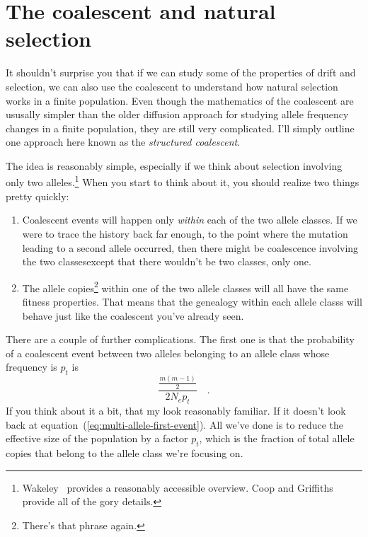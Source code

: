 \section*{The coalescent and natural selection}

It shouldn't surprise you that if we can study some of the properties
of drift and selection, we can also use the coalescent to understand
how natural selection works in a finite population. Even though the
mathematics of the coalescent are ususally simpler than the older
diffusion approach for studying allele frequency changes in a finite
population, they are still very complicated. I'll simply outline one
approach here known as the {\it structured
  coalescent}. 

The idea is reasonably simple, especially if we think about selection
involving only two alleles.\footnote{Wakeley~\cite{Wakeley-2010}
  provides a reasonably accessible overview. Coop and
  Griffiths~\cite{Coop-Griffiths-2004} provide all of the gory
  details.} When you start to think about it, you should realize two
things pretty quickly:

\begin{enumerate}

  \item Coalescent events will happen only {\it within} each of the
    two allele classes. If we were to trace the history back far
    enough, to the point where the mutation leading to a second allele
    occurred, then there might be coalescence involving the two
    classes{\dash}except that there wouldn't be two classes, only
    one.

  \item The allele copies\footnote{There's that phrase again.} within
    one of the two allele classes will all have the same fitness
    properties. That means that the genealogy within each allele
    classs will behave just like the coalescent you've already seen.
    
 \end{enumerate}
There are a couple of further complications. The first one is that the
probability of a coalescent event between two alleles belonging to an
allele class whose frequency is $p_t$ is
\[
 \frac{\frac{m(m-1)}{2}}{2N_ep_t} \quad .
 \]
If you think about it a bit, that my look reasonably familiar. If it
doesn't look back at equation~(\ref{eq:multi-allele-first-event}). All
we've done is to reduce the effective size of the population by a
factor $p_t$, which is the fraction of total allele copies that belong
to the allele class we're focusing on.

